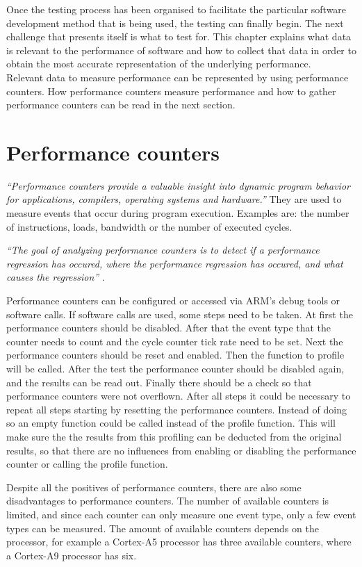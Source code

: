 Once the testing process has been organised to facilitate the particular software development method that is being used, the testing can finally begin. The next challenge that presents itself is what to test for. This chapter explains what data is relevant to the performance of software and how to collect that data in order to obtain the most accurate representation of the underlying performance. \\

Relevant data to measure performance can be represented by using performance counters. How performance counters measure performance and how to gather performance counters can be read in the next section.

\section{Performance counters}
\textit{``Performance counters provide a valuable insight into dynamic program behavior for applications, compilers, operating systems and hardware.''}\cite{zagha1996performance}
They are used to measure events that occur during program execution. Examples are: the number of instructions, loads, bandwidth or the number of executed cycles.

\textit{``The goal of analyzing performance counters is to detect if a performance regression has occured, where the performance regression has occured, and what causes the regression''} \cite{nguyen2012using}.

Performance counters can be configured or accessed via ARM's debug tools or software calls. If software calls are used, some steps need to be taken. At first the performance counters should be disabled. After that the event type that the counter needs to count and the cycle counter tick rate need to be set. Next the performance counters should be reset and enabled. Then the function to profile will be called. After the test the performance counter should be disabled again, and the results can be read out. Finally there should be a check so that performance counters were not overflown. After all steps it could be necessary to repeat all steps starting by resetting the performance counters. Instead of doing so an empty function could be called instead of the profile function. This will make sure the the results from this profiling can be deducted from the original results, so that there are no influences from enabling or disabling the performance counter or calling the profile function.

Despite all the positives of performance counters, there are also some disadvantages to performance counters. The number of available counters is limited, and since each counter can only measure one event type, only a few event types can be measured. The amount of available counters depends on the processor, for example a Cortex-A5 processor has three available counters, where a Cortex-A9 processor has six.

